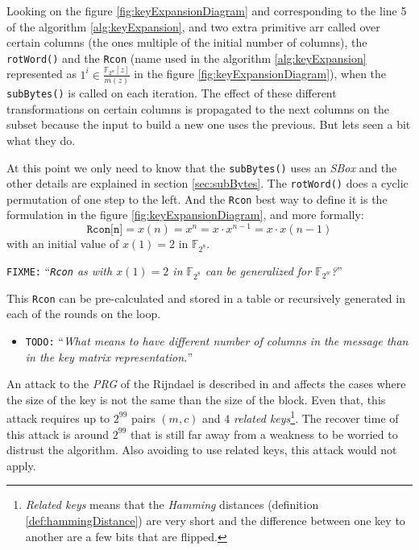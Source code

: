 \documentclass[10pt,a4paper,twoside]{llncs}
\newcommand{\todo}[1]{\texttt{\color{red}TODO:} ``\emph{#1}''}
\newcommand{\fixme}[1]{\texttt{\color{red}FIXME:} ``\emph{#1}''}
\newcommand{\Fpn}[2]{\ensuremath{\mathbb{F}_{#1^#2}}}
\begin{document}
Looking on the figure \ref{fig:keyExpansionDiagram} and corresponding to the line 5 of the algorithm \ref{alg:keyExpansion}, and two extra primitive arr called over certain columns (the ones multiple of the initial number of columns), the {\tt rotWord()} and the {\tt Rcon} (name used in the algorithm \ref{alg:keyExpansion} represented as $1^{i} \in\frac{\mathbb{F}_{2^{w}}[z]}{m(z)}$ in the figure \ref{fig:keyExpansionDiagram}), when the {\tt subBytes()} is called on each iteration. The effect of these different transformations on certain columns is propagated to the next columns on the subset because the input to build a new one uses the previous. But lets seen a bit what they do.

At this point we only need to know that the {\tt subBytes()} uses an \emph{SBox} and the other details are explained in section \ref{sec:subBytes}. The {\tt rotWord()} does a cyclic permutation of one step to the left. And the {\tt Rcon} best way to define it is the formulation in the figure \ref{fig:keyExpansionDiagram}, and more formally:
\begin{equation}\label{eq:rcon}
    \texttt{Rcon[n]} = x(n) = x^n = x\cdot x^{n-1}=x\cdot x(n-1)
\end{equation}
with an initial value of $x(1)=2$ in \Fpn{2}{8}.

\fixme{{\tt Rcon} as with $x(1)=2$ in \Fpn{2}{8} can be generalized for \Fpn{2}{w}?}

This {\tt Rcon} can be pre-calculated and stored in a table or recursively generated in each of the rounds on the loop.

\begin{itemize}
 \item \todo{What means to have different number of columns in the message than in the key matrix representation.}
\end{itemize}

An attack to the \emph{PRG} of the Rijndael is described in \cite{fullaes-192-256} and affects the cases where the size of the key is not the same than the size of the block. Even that, this attack requires up to $2^{99}$ pairs $(m,c)$ and $4$ \emph{related keys}\footnote{\emph{Related keys} means that the \emph{Hamming} distances (definition \ref{def:hammingDistance}) are very short and the difference between one key to another are a few bits that are flipped.}. The recover time of this attack is around $2^{99}$ that is still far away from a weakness to be worried to distrust the algorithm. Also avoiding to use related keys, this attack would not apply.
\end{document}
